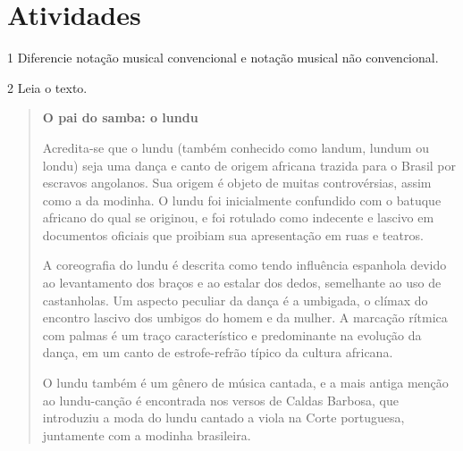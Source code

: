 \section{Atividades}

\num{1} Diferencie notação musical convencional e notação musical não convencional.


\num{2} Leia o texto.

\begin{quote}
\textbf{O pai do samba: o lundu}

Acredita-se que o lundu (também conhecido como landum, lundum ou londu) seja uma dança e 
canto de origem africana trazida para o Brasil por escravos angolanos. Sua origem é 
objeto de muitas controvérsias, assim como a da modinha. O lundu foi inicialmente 
confundido com o batuque africano do qual se originou, e foi rotulado como indecente e 
lascivo em documentos oficiais que proibiam sua apresentação em ruas e teatros.

A coreografia do lundu é descrita como tendo influência espanhola devido ao levantamento 
dos braços e ao estalar dos dedos, semelhante ao uso de castanholas. Um aspecto peculiar 
da dança é a umbigada, o clímax do encontro lascivo dos umbigos do homem e da mulher. A 
marcação rítmica com palmas é um traço característico e predominante na evolução da 
dança, em um canto de estrofe-refrão típico da cultura africana.

O lundu também é um gênero de música cantada, e a mais antiga menção ao lundu-canção é 
encontrada nos versos de Caldas Barbosa, que introduziu a moda do lundu cantado a viola 
na Corte portuguesa, juntamente com a modinha brasileira.

\end{quote}

